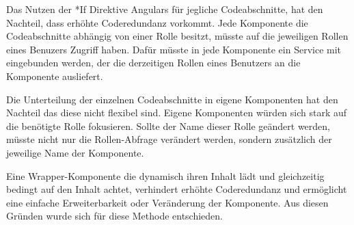 Das Nutzen der *If Direktive Angulars für jegliche Codeabschnitte, hat den Nachteil, dass erhöhte Coderedundanz vorkommt. Jede Komponente die Codeabschnitte abhängig von einer Rolle besitzt, müsste auf die jeweiligen Rollen eines Benuzers Zugriff haben. Dafür müsste in jede Komponente ein Service mit eingebunden werden, der die derzeitigen Rollen eines Benutzers an die Komponente ausliefert.

Die Unterteilung der einzelnen Codeabschnitte in eigene Komponenten hat den Nachteil das diese nicht flexibel sind. Eigene Komponenten würden sich stark auf die benötigte Rolle fokusieren. Sollte der Name dieser Rolle geändert werden, müsste nicht nur die Rollen-Abfrage verändert werden, sondern zusätzlich der jeweilige Name der Komponente.

Eine Wrapper-Komponente die dynamisch ihren Inhalt lädt und gleichzeitig bedingt auf den Inhalt achtet, verhindert erhöhte Coderedundanz und ermöglicht eine einfache Erweiterbarkeit oder Veränderung der Komponente. Aus diesen Gründen wurde sich für diese Methode entschieden.
